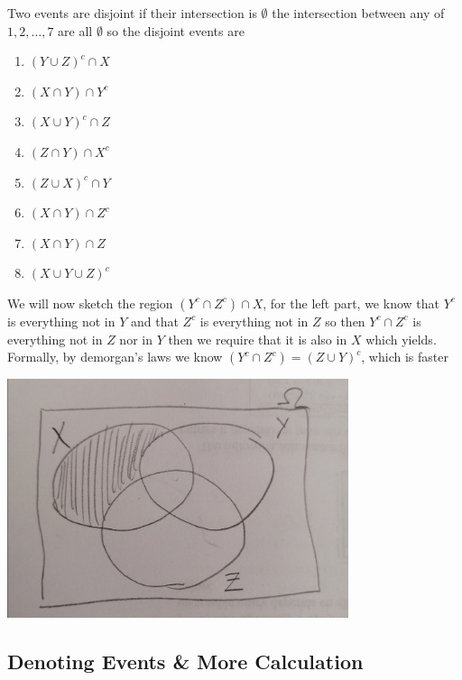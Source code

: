\documentclass[11pt]{book}
\begin{document}
Two events are disjoint if their intersection is $\emptyset $ the intersection between any of $1, 2, \ldots , 7$ are all $\emptyset $ so the disjoint events are
\begin{enumerate}
    \item $\left( Y\cup Z \right)^{c}  \cap X$ 
    \item $\left( X\cap Y \right) \cap Y^{c} $ 
    \item $\left( X\cup Y \right) ^{c} \cap Z$ 
    \item $\left( Z\cap Y \right) \cap X^{c} $ 
    \item $\left( Z\cup X \right) ^{c} \cap Y$ 
    \item $\left( X \cap Y \right) \cap Z^{c} $ 
    \item $\left( X\cap Y \right) \cap Z$ 
    \item $\left( X \cup Y\cup Z \right) ^{c} $ 
\end{enumerate}

We will now sketch the region $\left( Y^{c} \cap Z^{c}  \right) \cap X$, for the left part, we know that $Y^{c} $ is everything not in $Y$ and that $Z^{c} $ is everything not in $Z$ so then $Y^{c} \cap Z^{c} $ is everything not in $Z$ nor in $Y$ then we require that it is also in $X$ which yields. Formally, by demorgan's laws we know $\left( Y^{c} \cap Z^{c}  \right) = \left( Z\cup Y \right) ^{c} $, which is faster
\begin{center}
    \includegraphics[width=100mm]{assets/lec1-sketch.jpg} 
\end{center}




\subsection{Denoting Events \& More Calculation}%
\label{sub:denoting_events_&_more_calculation}
\end{document}
